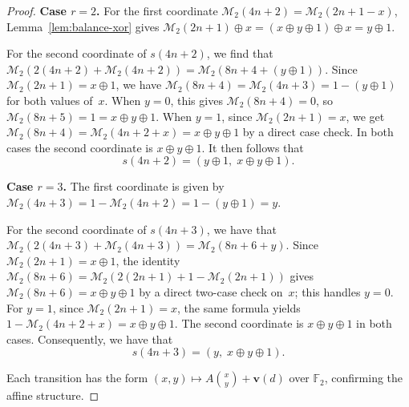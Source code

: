 \documentclass[10pt,a4paper]{amsart}
\begin{document}
\begin{proof}
\textbf{Case $r = 2$.} For the first coordinate $\mathcal{M}_{2}(4n+2) = \mathcal{M}_{2}(2n + 1 - x)$, Lemma~\ref{lem:balance-xor} gives $\mathcal{M}_{2}(2n+1) \oplus x = (x \oplus y \oplus 1) \oplus x = y \oplus 1$.

 For the second coordinate of $s(4n+2)$, we find that $\mathcal{M}_{2}(2(4n+2)+\mathcal{M}_{2}(4n+2)) = \mathcal{M}_{2}(8 n + 4 + 
 (y\oplus 1))$. Since $\mathcal{M}_{2}(2n+1) = x \oplus 1$, we have $\mathcal{M}_{2}(8 n + 4) = \mathcal{M}_{2}(4n+3) = 1-(y \oplus 
 1)$ for both values of~$x$. When $y=0$, this gives $\mathcal{M}_{2}(8n+4)=0$, so $\mathcal{M}_{2}(8n+5)=1=x\oplus y\oplus 1$.
When $y=1$, since $\mathcal{M}_{2}(2n+1)=x$, we get $\mathcal{M}_{2}(8n+4) = \mathcal{M}_{2}(4n+2+x)=x\oplus y\oplus 1$ by a 
 direct case check. In both cases the second coordinate is $x \oplus y \oplus 1$. It then follows that 
\[
 s(4n+2) = (y \oplus 1,\; x \oplus y \oplus 1).
\]

\textbf{Case $r = 3$.}
 The first coordinate is given by $\mathcal{M}_{2}(4n+3) = 1 - \mathcal{M}_{2}(4n+2) = 1 - (y\oplus 1) = y$.

 For the second coordinate of $s(4n+3)$, we have that $\mathcal{M}_{2}(2(4n+3)+\mathcal{M}_{2}(4n+3)) = \mathcal{M}_{2}(8 n + 6 + 
 y)$. Since $\mathcal{M}_{2}(2n+1) = x \oplus 1$, the identity $\mathcal{M}_{2}(8n+6) = \mathcal{M}_{2}(2(2n+1) + 1 - 
 \mathcal{M}_{2}(2n+1))$ gives $\mathcal{M}_{2}(8n+6) = x \oplus y \oplus 1$ by a direct two-case check on~$x$; this handles $y = 
 0$. For $y=1$, since $\mathcal{M}_{2}(2n+1)=x$, the same formula yields $1-\mathcal{M}_{2}(4n+2+x) = x\oplus y\oplus 1$. The
 second coordinate is $x \oplus y \oplus 1$ in both cases. Consequently, we have that 
$$ s(4n+3) = (y,\; x \oplus y \oplus 1).
$$

Each transition has the form $(x,y) \mapsto A\binom{x}{y} + \mathbf{v}(d)$ over $\mathbb{F}_2$, confirming the affine structure.
\end{proof}
\end{document}
